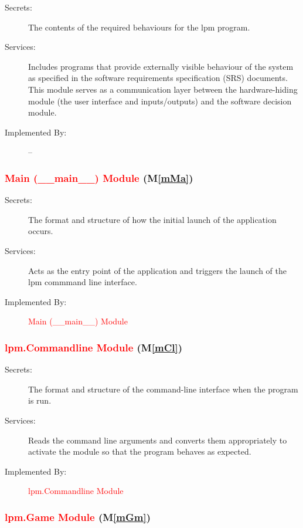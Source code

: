 \documentclass[12pt, titlepage]{article}
\newcommand{\mref}[1]{M\ref{#1}}
\begin{document}
\begin{description}
\item[Secrets:] The contents of the required behaviours for the lpm program.
\item[Services:] Includes programs that provide externally visible behaviour of
  the system as specified in the software requirements specification (SRS)
  documents. This module serves as a communication layer between the
  hardware-hiding module (the user interface and inputs/outputs) and the software decision module.
\item[Implemented By:] --
\end{description}

\subsubsection{\textcolor{red}{Main (\_\_main\_\_) Module} (\mref{mMa})}

\begin{description}
\item[Secrets:] The format and structure of how the initial launch of the application occurs.
\item[Services:] Acts as the entry point of the application and triggers the launch of the lpm commmand line interface.
\item[Implemented By:] \textcolor{red}{Main (\_\_main\_\_) Module}
\end{description}

\subsubsection{\textcolor{red}{lpm.Commandline Module} (\mref{mCl})}

\begin{description}
\item[Secrets:]The format and structure of the command-line interface when the program is run.
\item[Services:] Reads the command line arguments and converts them appropriately to activate the module so that the program behaves as expected.
\item[Implemented By:] \textcolor{red}{lpm.Commandline Module}
\end{description}

\subsubsection{\textcolor{red}{lpm.Game Module} (\mref{mGm})}
\end{document}
